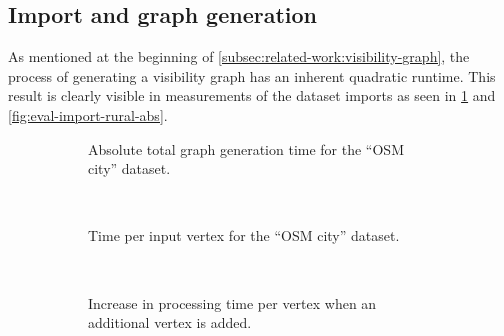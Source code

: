 	\subsection{Import and graph generation}
	
		As mentioned at the beginning of \cref{subsec:related-work:visibility-graph}, the process of generating a visibility graph has an inherent quadratic runtime.
		This result is clearly visible in measurements of the dataset imports as seen in \cref{fig:eval-import-city-abs} and \cref{fig:eval-import-rural-abs}.
		
		\begin{figure}[h!]
			\begin{minipage}{.48\textwidth}
				\begin{subfigure}[t]{\linewidth}
					\begin{figcenter}
						
					\end{figcenter}
					\caption{Absolute total graph generation time for the \enquote{OSM city} dataset.}
					\label{fig:eval-import-city-abs}
				\end{subfigure}
				\\[3ex]
				\begin{subfigure}[t]{\linewidth}
					\begin{figcenter}
						
					\end{figcenter}
					\caption{Time per input vertex for the \enquote{OSM city} dataset.}
				\end{subfigure}
				\\[3ex]
				\begin{subfigure}[t]{\linewidth}
					\begin{figcenter}
						
					\end{figcenter}
					\caption{Increase in processing time per vertex when an additional vertex is added.}
					\label{fig:eval-import-city-rel-increase}
				\end{subfigure}
				\caption{Graph generation times using the \enquote{OSM city} dataset.}
				\label{fig:eval-import-city}
			\end{minipage}
			\hfill
			\begin{minipage}{.48\textwidth}
				\begin{subfigure}[t]{\linewidth}
					\begin{figcenter}

\end{figcenter}
\end{subfigure}
\end{minipage}
\end{figure}
